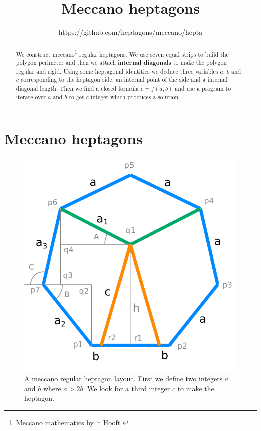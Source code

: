 \documentclass[11pt]{article}
\title{\textbf{Meccano heptagons}}
\author{https://github.com/heptagons/meccano/hepta}
\date{}
\begin{document}
\maketitle
\begin{abstract}
We construct meccano\footnote{
\href{https://webspace.science.uu.nl/~hooft101/lectures/meccano.pdf}{Meccano mathematics by `t Hooft }
}
regular heptagons.
We use seven equal strips to build the polygon perimeter and then we attach \textbf{internal diagonals} to make the polygon regular and rigid. Using some
heptagonal identities we deduce three variables $a$, $b$ and $c$ corresponding
to the heptagon side, an internal point of the side and a internal diagonal length.
Then we find a closed formula $c = f(a,b)$ and use a program to iterate over $a$ and
$b$ to get $c$ integer which produces a solution.
\end{abstract}

\section{Meccano heptagons}

\begin{figure}[htp]
\centering
\includegraphics[scale=1]{figs/heptagon_plan.pdf}
\caption{A meccano regular heptagon layout. First we define two integers $a$ and $b$ where $a > 2b$. We look for a third integer $c$ to make the heptagon.}
\label{heptagonplan}
\end{figure}
\end{document}
